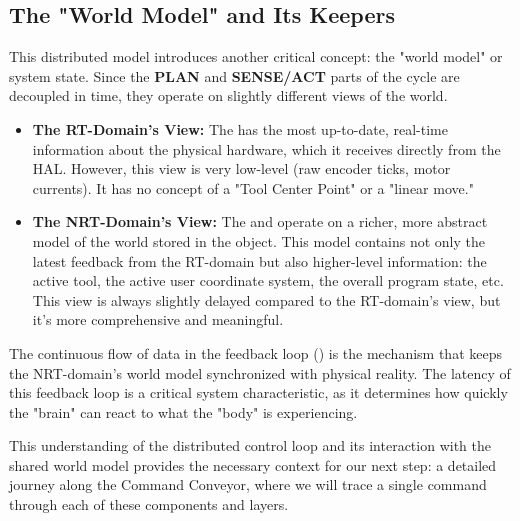 

\subsection{The "World Model" and Its Keepers}
\label{subsec:world_model}

This distributed model introduces another critical concept: the "world model" or system state. Since the \textbf{PLAN} and \textbf{SENSE/ACT} parts of the cycle are decoupled in time, they operate on slightly different views of the world.

\begin{itemize}
    \item \textbf{The RT-Domain's View:} The  has the most up-to-date, real-time information about the physical hardware, which it receives directly from the HAL. However, this view is very low-level (raw encoder ticks, motor currents). It has no concept of a "Tool Center Point" or a "linear move."
    \item \textbf{The NRT-Domain's View:} The  and  operate on a richer, more abstract model of the world stored in the  object. This model contains not only the latest feedback from the RT-domain but also higher-level information: the active tool, the active user coordinate system, the overall program state, etc. This view is always slightly delayed compared to the RT-domain's view, but it's more comprehensive and meaningful.
\end{itemize}

The continuous flow of data in the feedback loop () is the mechanism that keeps the NRT-domain's world model synchronized with physical reality. The latency of this feedback loop is a critical system characteristic, as it determines how quickly the "brain" can react to what the "body" is experiencing.

This understanding of the distributed control loop and its interaction with the shared world model provides the necessary context for our next step: a detailed journey along the Command Conveyor, where we will trace a single command through each of these components and layers.



